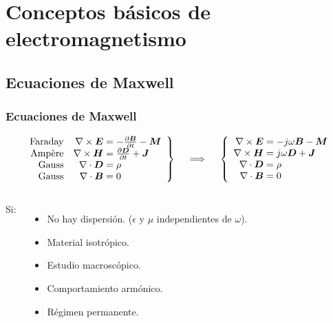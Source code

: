 \documentclass{beamer}
\renewcommand{\vec}[1]{\boldsymbol{#1}}
\begin{document}
\section{Conceptos básicos de electromagnetismo}

	\subsection{Ecuaciones de Maxwell} %
	
		\begin{frame}
		\frametitle{Ecuaciones de Maxwell}
		
		\begin{align*}
		\left.\begin{array}{rr@{\mskip\thickmuskip}l}
		\text{Faraday} &\nabla \times \vec{E} & = -\frac{\partial \vec{B}}{\partial t} - \vec{M}\\
		\text{Ampère} &\nabla \times \vec{H} & = \frac{\partial \vec{D}}{\partial t} + \vec{J} \\
		\text{Gauss} &\nabla \cdot \vec{D} & = \rho \\
		\text{Gauss} & \nabla \cdot \vec{B} & = 0
		\end{array} \right\}
		\quad \implies \quad
		\left\{\begin{array}{r@{\mskip\thickmuskip}l}
		\nabla \times \vec{E} & = -j \omega \vec{B} - \vec{M} \\
		\nabla \times \vec{H} & = j \omega \vec{D} + \vec{J} \\
		\nabla \cdot \vec{D} & = \rho\\
		\nabla \cdot \vec{B} & = 0
		\end{array}\right.
		\end{align*}
		
		\begin{columns}[c] %
			
			
			Si:
			\begin{itemize}
				\item No hay dispersión. ($\epsilon$ y $\mu$ independientes de $\omega$).
				\item Material isotrópico.
				\item Estudio macroscópico.
				\item Comportamiento armónico.
				\item Régimen permanente.
			\end{itemize}
			

\end{columns}
\end{frame}
\end{document}
